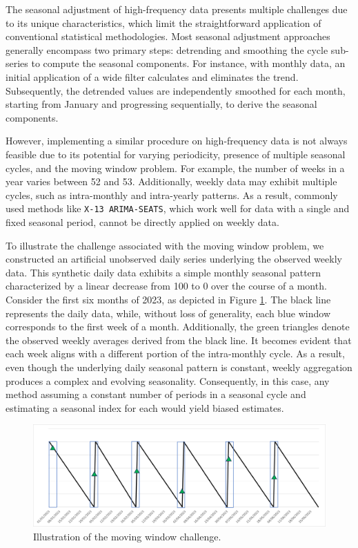 The seasonal adjustment of high-frequency data presents multiple challenges due to its unique characteristics, which limit the straightforward application of conventional statistical methodologies. Most seasonal adjustment approaches generally encompass two primary steps: detrending and smoothing the cycle sub-series to compute the seasonal components. For instance, with monthly data, an initial application of a wide filter calculates and eliminates the trend. Subsequently, the detrended values are independently smoothed for each month, starting from January and progressing sequentially, to derive the seasonal components.

However, implementing a similar procedure on high-frequency data is not always feasible due to its potential for varying periodicity, presence of multiple seasonal cycles, and the moving window problem. For example, the number of weeks in a year varies between 52 and 53. Additionally, weekly data may exhibit multiple cycles, such as intra-monthly and intra-yearly patterns. As a result, commonly used methods like \texttt{X-13\ ARIMA-SEATS}, which work well for data with a single and fixed seasonal period, cannot be directly applied on weekly data.

To illustrate the challenge associated with the moving window problem, we constructed an artificial unobserved daily series underlying the observed weekly data. This synthetic daily data exhibits a simple monthly seasonal pattern characterized by a linear decrease from 100 to 0 over the course of a month. Consider the first six months of 2023, as depicted in Figure \ref{fig:mov-window-problem}. The black line represents the daily data, while, without loss of generality, each blue window corresponds to the first week of a month. Additionally, the green triangles denote the observed weekly averages derived from the black line. It becomes evident that each week aligns with a different portion of the intra-monthly cycle. As a result, even though the underlying daily seasonal pattern is constant, weekly aggregation produces a complex and evolving seasonality. Consequently, in this case, any method assuming a constant number of periods in a seasonal cycle and estimating a seasonal index for each would yield biased estimates.

\begin{figure}[H]

{\centering \includegraphics[width=1\linewidth,]{figures/mov-window-problem} 

}

\caption{Illustration of the moving window challenge.}\label{fig:mov-window-problem}
\end{figure}

